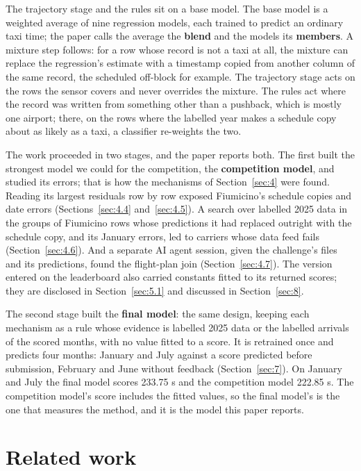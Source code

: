 \documentclass[
  manuscript=article,
  layout=preprint,
  year=2026,
  volume=x,
]{extra/joas}
\begin{document}
The trajectory stage and the rules sit on a base model. The base model is a weighted average of nine regression models, each trained to predict an ordinary taxi time; the paper calls the average the \textbf{blend} and the models its \textbf{members}. A mixture step follows: for a row whose record is not a taxi at all, the mixture can replace the regression's estimate with a timestamp copied from another column of the same record, the scheduled off-block for example. The trajectory stage acts on the rows the sensor covers and never overrides the mixture. The rules act where the record was written from something other than a pushback, which is mostly one airport; there, on the rows where the labelled year makes a schedule copy about as likely as a taxi, a classifier re-weights the two.

The work proceeded in two stages, and the paper reports both. The first built the strongest model we could for the competition, the \textbf{competition model}, and studied its errors; that is how the mechanisms of Section~\ref{sec:4} were found. Reading its largest residuals row by row exposed Fiumicino's schedule copies and date errors (Sections~\ref{sec:4.4} and~\ref{sec:4.5}). A search over labelled 2025 data in the groups of Fiumicino rows whose predictions it had replaced outright with the schedule copy, and its January errors, led to carriers whose data feed fails (Section~\ref{sec:4.6}). And a separate AI agent session, given the challenge's files and its predictions, found the flight-plan join (Section~\ref{sec:4.7}). The version entered on the leaderboard also carried constants fitted to its returned scores; they are disclosed in Section~\ref{sec:5.1} and discussed in Section~\ref{sec:8}.

The second stage built the \textbf{final model}: the same design, keeping each mechanism as a rule whose evidence is labelled 2025 data or the labelled arrivals of the scored months, with no value fitted to a score. It is retrained once and predicts four months: January and July against a score predicted before submission, February and June without feedback (Section~\ref{sec:7}). On January and July the final model scores 233.75 s and the competition model 222.85 s. The competition model's score includes the fitted values, so the final model's is the one that measures the method, and it is the model this paper reports.

\section{Related work}\label{sec:2}
\end{document}
